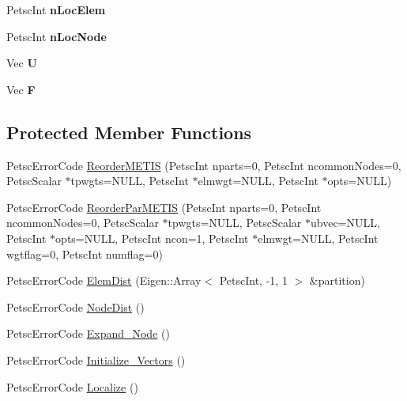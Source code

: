 \begin{DoxyCompactItemize}
\item 
\mbox{\label{class_mesh_af1953886f04ff875c2ca36da8a4f38e2}} 
Petsc\+Int {\bfseries n\+Loc\+Elem}
\item 
\mbox{\label{class_mesh_a9f1050136cf607064480c079976a6663}} 
Petsc\+Int {\bfseries n\+Loc\+Node}
\item 
\mbox{\label{class_mesh_a3f9917990c7eab0ec45e48131737acf1}} 
Vec {\bfseries U}
\item 
\mbox{\label{class_mesh_a7a473f5eda4af43fb9d83873c51f52b0}} 
Vec {\bfseries F}
\end{DoxyCompactItemize}
\subsection*{Protected Member Functions}
\begin{DoxyCompactItemize}
\item 
Petsc\+Error\+Code \mbox{\hyperlink{class_mesh_a0ab1f20471ff5deed8803597b979779d}{Reorder\+M\+E\+T\+IS}} (Petsc\+Int nparts=0, Petsc\+Int ncommon\+Nodes=0, Petsc\+Scalar $\ast$tpwgts=N\+U\+LL, Petsc\+Int $\ast$elmwgt=N\+U\+LL, Petsc\+Int $\ast$opts=N\+U\+LL)
\item 
Petsc\+Error\+Code \mbox{\hyperlink{class_mesh_ab9c61b0cf7cbcb8738d0e904fe532e91}{Reorder\+Par\+M\+E\+T\+IS}} (Petsc\+Int nparts=0, Petsc\+Int ncommon\+Nodes=0, Petsc\+Scalar $\ast$tpwgts=N\+U\+LL, Petsc\+Scalar $\ast$ubvec=N\+U\+LL, Petsc\+Int $\ast$opts=N\+U\+LL, Petsc\+Int ncon=1, Petsc\+Int $\ast$elmwgt=N\+U\+LL, Petsc\+Int wgtflag=0, Petsc\+Int numflag=0)
\item 
Petsc\+Error\+Code \mbox{\hyperlink{class_mesh_a1c915802d56c4ded24e460e83cfb5399}{Elem\+Dist}} (Eigen\+::\+Array$<$ Petsc\+Int, -\/1, 1 $>$ \&partition)
\item 
Petsc\+Error\+Code \mbox{\hyperlink{class_mesh_aa6b19f4fdf210f8937694e8c7d30ea15}{Node\+Dist}} ()
\item 
Petsc\+Error\+Code \mbox{\hyperlink{class_mesh_a1930d80c707de6d202dac7cef0022257}{Expand\+\_\+\+Node}} ()
\item 
Petsc\+Error\+Code \mbox{\hyperlink{class_mesh_af9e180bd8adb9c495e6c38840ea19f10}{Initialize\+\_\+\+Vectors}} ()
\item 
Petsc\+Error\+Code \mbox{\hyperlink{class_mesh_a54a12376bf99f4f4991af01fc23c9c09}{Localize}} ()
\end{DoxyCompactItemize}


